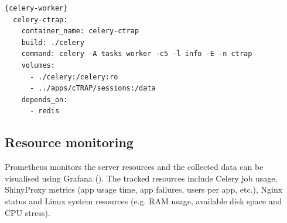 \begin{lstlisting}[caption=Configuration of the Celery service for cTRAP in \texttt{docker-compose.yml}.,language=XML,label={lst:celery-worker}]{celery-worker}
  celery-ctrap:
    container_name: celery-ctrap
    build: ./celery
    command: celery -A tasks worker -c5 -l info -E -n ctrap
    volumes:
      - ./celery:/celery:ro
      - ../apps/cTRAP/sessions:/data
    depends_on:
      - redis
\end{lstlisting}

\subsection{Resource monitoring}

Prometheus monitors the server resources and the collected data can be visualised using Grafana (). The tracked resources include Celery job usage, ShinyProxy metrics (app usage time, app failures, users per app, etc.), Nginx status and Linux system resources (e.g. RAM usage, available disk space and CPU stress).

